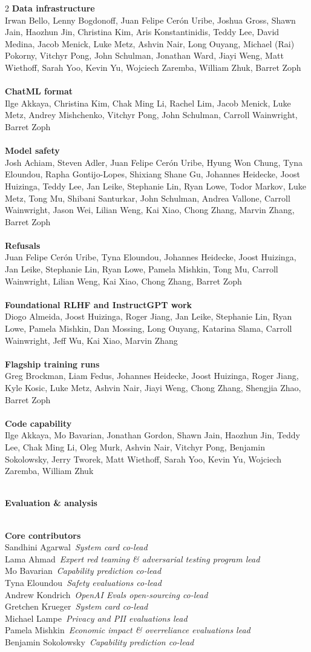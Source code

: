\documentclass{article}
\newcommand{\creditsectionheader}[1]{\parbox{\columnwidth}{\centering \textbf{\small #1}}\\}
\newcommand{\creditlistheader}[1]{\textbf{#1}\footnotemark[\thefootnote]\\}
\newcommand{\creditlist}[2]{\creditlistheader{#1}#2\\
\\}
\newcommand{\corecontributor}[2]{#1\ \textit{#2}\\}
\begin{document}
\begin{multicols}{2}
\creditlist{Data infrastructure}{Irwan Bello, Lenny Bogdonoff, Juan Felipe Cer\'on Uribe, Joshua Gross, Shawn Jain, Haozhun Jin, Christina Kim, Aris Konstantinidis, Teddy Lee, David Medina, Jacob Menick, Luke Metz, Ashvin Nair, Long Ouyang, Michael (Rai) Pokorny, Vitchyr Pong, John Schulman, Jonathan Ward, Jiayi Weng, Matt Wiethoff, Sarah Yoo, Kevin Yu, Wojciech Zaremba, William Zhuk, Barret Zoph}
\creditlist{ChatML format}{Ilge Akkaya, Christina Kim, Chak Ming Li, Rachel Lim, Jacob Menick, Luke Metz, Andrey Mishchenko, Vitchyr Pong, John Schulman, Carroll Wainwright, Barret Zoph}
\creditlist{Model safety}{Josh Achiam, Steven Adler, Juan Felipe Cer\'on Uribe, Hyung Won Chung, Tyna Eloundou, Rapha Gontijo-Lopes, Shixiang Shane Gu, Johannes Heidecke, Joost Huizinga, Teddy Lee, Jan Leike, Stephanie Lin, Ryan Lowe, Todor Markov, Luke Metz, Tong Mu, Shibani Santurkar, John Schulman, Andrea Vallone, Carroll Wainwright, Jason Wei, Lilian Weng, Kai Xiao, Chong Zhang, Marvin Zhang, Barret Zoph}
\creditlist{Refusals}{Juan Felipe Cer\'on Uribe, Tyna Eloundou, Johannes Heidecke, Joost Huizinga, Jan Leike, Stephanie Lin, Ryan Lowe, Pamela Mishkin, Tong Mu, Carroll Wainwright, Lilian Weng, Kai Xiao, Chong Zhang, Barret Zoph}
\creditlist{Foundational RLHF and InstructGPT work}{Diogo Almeida, Joost Huizinga, Roger Jiang, Jan Leike, Stephanie Lin, Ryan Lowe, Pamela Mishkin, Dan Mossing, Long Ouyang, Katarina Slama, Carroll Wainwright, Jeff Wu, Kai Xiao, Marvin Zhang}
\creditlist{Flagship training runs}{Greg Brockman, Liam Fedus, Johannes Heidecke, Joost Huizinga, Roger Jiang, Kyle Kosic, Luke Metz, Ashvin Nair, Jiayi Weng, Chong Zhang, Shengjia Zhao, Barret Zoph}
\creditlist{Code capability}{Ilge Akkaya, Mo Bavarian, Jonathan Gordon, Shawn Jain, Haozhun Jin, Teddy Lee, Chak Ming Li, Oleg Murk, Ashvin Nair, Vitchyr Pong, Benjamin Sokolowsky, Jerry Tworek, Matt Wiethoff, Sarah Yoo, Kevin Yu, Wojciech Zaremba, William Zhuk}
\creditsectionheader{Evaluation \& analysis}
\creditlistheader{Core contributors}
\corecontributor{Sandhini Agarwal}{System card co-lead}
\corecontributor{Lama Ahmad}{Expert red teaming \& adversarial testing program lead}
\corecontributor{Mo Bavarian}{Capability prediction co-lead}
\corecontributor{Tyna Eloundou}{Safety evaluations co-lead}
\corecontributor{Andrew Kondrich}{OpenAI Evals open-sourcing co-lead}
\corecontributor{Gretchen Krueger}{System card co-lead}
\corecontributor{Michael Lampe}{Privacy and PII evaluations lead}
\corecontributor{Pamela Mishkin}{Economic impact \& overreliance evaluations lead}
\corecontributor{Benjamin Sokolowsky}{Capability prediction co-lead}

\end{multicols}
\end{document}
